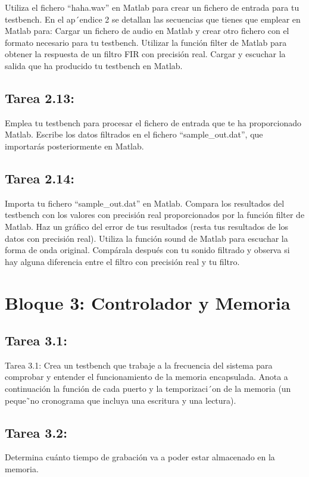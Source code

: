 \documentclass{article}
\begin{document}
Utiliza el fichero “haha.wav” en Matlab para crear un fichero de entrada para tu testbench. En el ap´endice 2 se detallan las secuencias que tienes que emplear en Matlab para:
Cargar un fichero de audio en Matlab y crear otro fichero con el formato necesario para tu testbench.
Utilizar la función filter de Matlab para obtener la respuesta de un filtro FIR con precisión real.
Cargar y escuchar la salida que ha producido tu testbench en Matlab.

\subsection{Tarea 2.13:}
Emplea tu testbench para procesar el fichero de entrada que te ha proporcionado
Matlab. Escribe los datos filtrados en el fichero “sample{\_}out.dat”, que importarás posteriormente en Matlab.

\subsection{Tarea 2.14:}
Importa tu fichero ``sample{\_}out.dat'' en Matlab. Compara los resultados del testbench con los valores con precisión real proporcionados por la función filter de Matlab. Haz un gráfico del error de tus resultados (resta tus resultados de los datos con precisión real).
Utiliza la función sound de Matlab para escuchar la forma de onda original. Compárala después con tu sonido filtrado y observa si hay alguna diferencia entre el filtro con precisión real y tu filtro.

\section{Bloque 3: Controlador y Memoria}

\subsection{Tarea 3.1:}
Tarea 3.1:
Crea un testbench que trabaje a la frecuencia del sistema para comprobar y entender el funcionamiento de la memoria encapsulada. Anota a continuación la función de cada
puerto y la temporizaci´on de la memoria (un peque˜no cronograma que incluya una escritura y una lectura).

\subsection{Tarea 3.2:}

Determina cuánto tiempo de grabación va a poder estar almacenado en la memoria.
\end{document}
